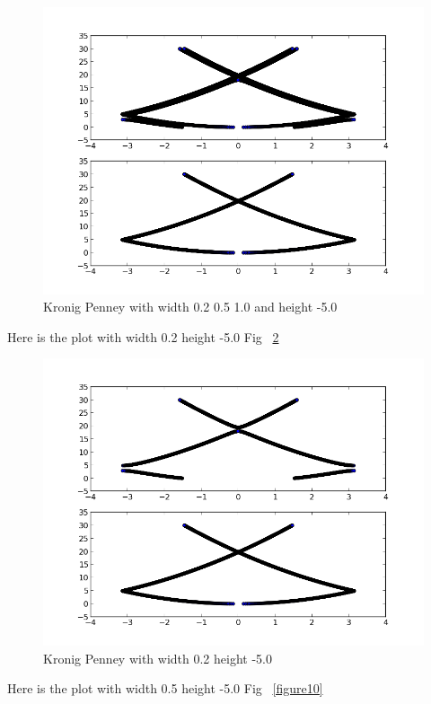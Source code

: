 \documentclass[11pt,letterpaper]{article}
\begin{document}
\begin{figure}
\begin{center}
\includegraphics[width=0.8\linewidth,angle=0]{kpw.png}
\caption{Kronig Penney with width 0.2 0.5 1.0 and height -5.0}
\label{figure8}
\end{center}
\end{figure}

Here is the plot with width 0.2 height -5.0 Fig ~\ref{figure9}

\begin{figure}
\begin{center}
\includegraphics[width=0.8\linewidth,angle=0]{kp0250.png}
\caption{Kronig Penney with width 0.2 height -5.0}
\label{figure9}
\end{center}
\end{figure}



Here is the plot with width 0.5 height -5.0 Fig ~\ref{figure10}
\end{document}
